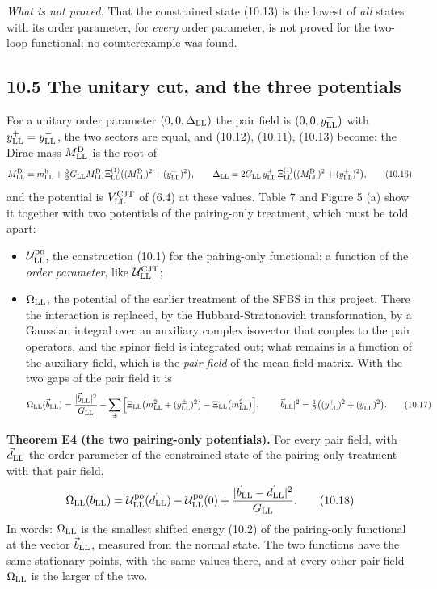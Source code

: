 \documentclass[
  10pt,
]{article}
\providecommand{\tightlist}{%
  \setlength{\itemsep}{0pt}\setlength{\parskip}{0pt}}
\begin{document}
\emph{What is not proved.} That the constrained state (10.13) is the
lowest of \emph{all} states with its order parameter, for \emph{every}
order parameter, is not proved for the two-loop functional; no
counterexample was found.

\hypertarget{the-unitary-cut-and-the-three-potentials}{%
\subsection{10.5 The unitary cut, and the three
potentials}\label{the-unitary-cut-and-the-three-potentials}}

For a unitary order parameter \((0,0,\Delta_{\rm LL})\) the pair field
is \((0,0,y^+_{\rm LL})\) with \(y^+_{\rm LL}=y^-_{\rm LL}\), the two
sectors are equal, and (10.12), (10.11), (10.13) become: the Dirac mass
\(M^{\rm D}_{\rm LL}\) is the root of
\[M^{\rm D}_{\rm LL}=m^{\rm b}_{\rm LL}+\tfrac32G_{\rm LL}M^{\rm D}_{\rm LL}\,\Xi^{(1)}_{\rm LL}\big((M^{\rm D}_{\rm LL})^2+(y^+_{\rm LL})^2\big),\qquad
\Delta_{\rm LL}=2G_{\rm LL}\,y^+_{\rm LL}\,\Xi^{(1)}_{\rm LL}\big((M^{\rm D}_{\rm LL})^2+(y^+_{\rm LL})^2\big),\tag{10.16}\]
and the potential is \(V^{\rm CJT}_{\rm LL}\) of (6.4) at these values.
Table 7 and Figure 5 (a) show it together with two potentials of the
pairing-only treatment, which must be told apart:

\begin{itemize}
\tightlist
\item
  \(\mathcal U^{\rm po}_{\rm LL}\), the construction (10.1) for the
  pairing-only functional: a function of the \emph{order parameter},
  like \(\mathcal U^{\rm CJT}_{\rm LL}\);
\item
  \(\Omega_{\rm LL}\), the potential of the earlier treatment of the
  SFBS in this project. There the interaction is replaced, by the
  Hubbard-Stratonovich transformation, by a Gaussian integral over an
  auxiliary complex isovector that couples to the pair operators, and
  the spinor field is integrated out; what remains is a function of the
  auxiliary field, which is the \emph{pair field} of the mean-field
  matrix. With the two gaps of the pair field it is
  \[\Omega_{\rm LL}(\vec b_{\rm LL})=\frac{\lvert\vec b_{\rm LL}\rvert^2}{G_{\rm LL}}-\sum_\pm\Big[\Xi_{\rm LL}\big(m_{\rm LL}^2+(y^\pm_{\rm LL})^2\big)-\Xi_{\rm LL}\big(m_{\rm LL}^2\big)\Big],\qquad\lvert\vec b_{\rm LL}\rvert^2=\tfrac12\big((y^+_{\rm LL})^2+(y^-_{\rm LL})^2\big).\tag{10.17}\]
\end{itemize}

\textbf{Theorem E4 (the two pairing-only potentials).} For every pair
field, with \(\vec d_{\rm LL}\) the order parameter of the constrained
state of the pairing-only treatment with that pair field,
\[\Omega_{\rm LL}(\vec b_{\rm LL})=\mathcal U^{\rm po}_{\rm LL}(\vec d_{\rm LL})-\mathcal U^{\rm po}_{\rm LL}(0)+\frac{\lvert\vec b_{\rm LL}-\vec d_{\rm LL}\rvert^2}{G_{\rm LL}}.\tag{10.18}\]
In words: \(\Omega_{\rm LL}\) is the smallest shifted energy (10.2) of
the pairing-only functional at the vector \(\vec b_{\rm LL}\), measured
from the normal state. The two functions have the same stationary
points, with the same values there, and at every other pair field
\(\Omega_{\rm LL}\) is the larger of the two.
\end{document}
